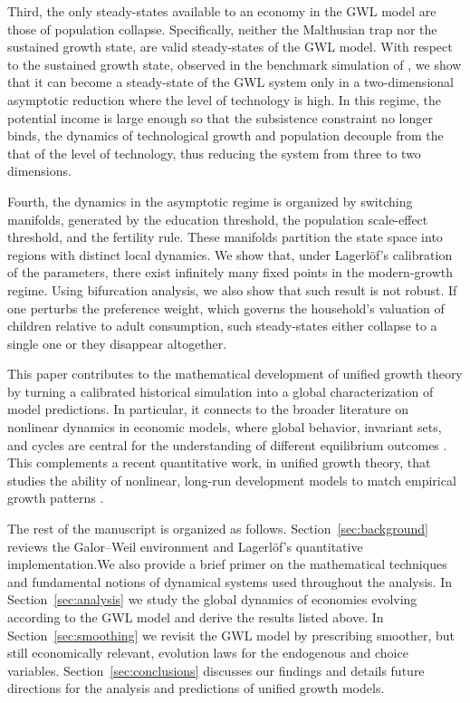 \documentclass[a4paper,fleqn]{cas-sc}
\begin{document}
Third, the only steady-states available to an economy in the GWL model are those of population collapse. Specifically, neither the Malthusian trap nor the sustained growth state, are valid steady-states of the GWL model. With respect to the sustained growth state, observed in the benchmark simulation of \citet{Lagerlof2006}, we show that it can become a steady-state of the GWL system only in a two-dimensional asymptotic reduction where the level of technology is high. In this regime, the potential income is large enough so that the subsistence constraint no longer binds, the dynamics of technological growth and population decouple from the that of the level of technology, thus reducing the system from three to two dimensions.

Fourth, the dynamics in the asymptotic regime is organized by switching manifolds, generated by the education threshold, the population scale-effect threshold, and the fertility rule. These manifolds partition the state space into regions with distinct local dynamics. We show that, under Lagerl\"{o}f's calibration of the parameters, there exist infinitely many fixed points in the modern-growth regime. Using bifurcation analysis, we also show that such result is not robust. If one perturbs the preference weight, which governs the household's valuation of children relative to adult consumption, such steady-states either collapse to a single one or they disappear altogether.

This paper contributes to the mathematical development of unified growth theory by turning a calibrated historical simulation into a global characterization of model predictions.
In particular, it connects to the broader literature on nonlinear dynamics in economic models, where global behavior, invariant sets, and cycles are central for the understanding of different equilibrium outcomes \citep{BenhabibDay1982,Matsuyama1999,GomisPorquerasHaro2003}.
This complements a recent quantitative work, in unified growth theory, that studies the ability of nonlinear, long-run development models to match empirical growth patterns \citep{CervellatiMeyerheimSunde2023}.

The rest of the manuscript is organized as follows. Section~\ref{sec:background} reviews the Galor--Weil environment and Lagerl{\"o}f's quantitative implementation.We also provide a brief primer on the mathematical techniques and fundamental notions of dynamical systems used throughout the analysis.  In Section~\ref{sec:analysis} we study the global dynamics of economies evolving according to the GWL model and derive the results listed above. In Section~\ref{sec:smoothing} we revisit the GWL model by prescribing smoother, but still economically relevant, evolution laws for the endogenous and choice variables. Section~\ref{sec:conclusions} discusses our findings and details future directions for the analysis  and predictions of unified growth models.
\end{document}
